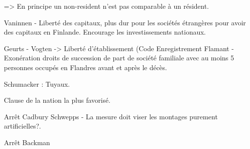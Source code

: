 \documentclass{book}
\begin{document}
=> En principe un non-resident n'est pas comparable à un résident.


Vaninnen - Liberté des capitaux, plus dur pour les sociétés étrangères pour avoir des capitaux en Finlande. Encourage les investissements nationaux.

Geurts - Vogten -> Liberté d'établissement (Code Enregistrement Flamant - Exonération droits de succession de part de société familiale avec au moins 5 personnes occupés en Flandres avant et après le décès.


Schumacker : Tuyaux.

Clause de la nation la plus favorisé.

Arrêt Cadbury Schwepps - La mesure doit viser les montages purement artificielles?.

Arrêt Backman

\nocite{*}

\end{document}
